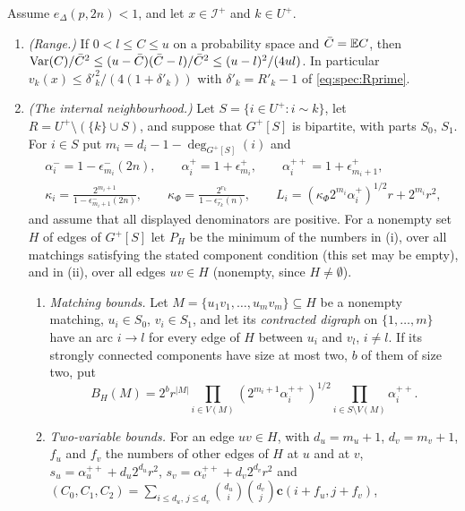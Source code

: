 \begin{lemma}\label{lem:push:localvariance}
Assume $e_\Delta(p,2n)<1$, and let $x\in\mathcal I^+$ and $k\in U^+$.
\begin{enumerate}[label=\textup{(\alph*)}]
\item \emph{(Range.)} If $0<l\le C\le u$ on a probability space and $\bar C=\mathbb E C$, then
  $\operatorname{Var}(C)/\bar C^2\le(u-\bar C)(\bar C-l)/\bar C^2\le(u-l)^2/(4ul)$. In particular
  $v_k(x)\le\delta'^2_k/(4(1+\delta'_k))$ with $\delta'_k=R'_k-1$ of \eqref{eq:spec:Rprime}.
\item \emph{(The internal neighbourhood.)} Let $S=\{i\in U^+:i\sim k\}$, let
  $R=U^+\setminus(\{k\}\cup S)$, and suppose that $G^+[S]$ is bipartite, with parts
  $S_0$, $S_1$. For $i\in S$ put $m_i=d_i-1-\deg_{G^+[S]}(i)$ and
  \begin{gather*}
    \alpha^-_i=1-\epsilon^-_{m_i}(2n),\qquad \alpha^+_i=1+\epsilon^+_{m_i},\qquad
    \alpha^{++}_i=1+\epsilon^+_{m_i+1},\\
    \kappa_i=\frac{2^{m_i+1}}{1-\epsilon^-_{m_i+1}(2n)},\qquad
    \kappa_\Phi=\frac{2^{r_k}}{1-\epsilon^-_{r_k}(n)},\qquad
    L_i=(\kappa_\Phi2^{m_i}\alpha^+_i)^{1/2}r+2^{m_i}r^2,
  \end{gather*}
  and assume that all displayed denominators are positive. For a nonempty set $H$ of
  edges of $G^+[S]$ let $P_H$ be the minimum of the numbers in
  (i), over all matchings satisfying the stated component
  condition (this set may be empty), and in (ii), over all edges
  $uv\in H$ (nonempty, since $H\ne\emptyset$).
  \begin{enumerate}[label=\textup{(\roman*)}]
  \item \emph{Matching bounds.} Let $M=\{u_1v_1,\dots,u_mv_m\}\subseteq H$ be a nonempty
    matching, $u_i\in S_0$, $v_i\in S_1$, and let its \emph{contracted digraph} on
    $\{1,\dots,m\}$ have an arc $i\to l$ for every edge of $H$ between $u_i$ and $v_l$,
    $i\ne l$. If its strongly connected components have size at most two, $b$ of them
    of size two, put
    \[
      B_H(M)=2^br^{|M|}\prod_{i\in V(M)}(2^{m_i+1}\alpha^{++}_i)^{1/2}
      \prod_{i\in S\setminus V(M)}\alpha^{++}_i .
    \]
  \item \emph{Two-variable bounds.} For an edge $uv\in H$, with $d_u=m_u+1$,
    $d_v=m_v+1$, $f_u$ and $f_v$ the numbers of other edges of $H$ at $u$ and at
    $v$, $s_u=\alpha^{++}_u+d_u2^{d_u}r^2$, $s_v=\alpha^{++}_v+d_v2^{d_v}r^2$ and
    $(C_0,C_1,C_2)=\sum_{i\le d_u,\,j\le d_v}\binom{d_u}i\binom{d_v}j\mathbf c(i+f_u,j+f_v)$,

\end{enumerate}
\end{enumerate}
\end{lemma}
